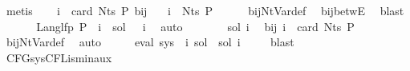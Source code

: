 \begin{isabellebody}
\ metis\isanewline
\isanewline
\ \ \isamarkupfalse%
\ {\isacartoucheopen}i\ {\isacharless}{\kern0pt}\ card\ {\isacharparenleft}{\kern0pt}Nts\ P{\isacharparenright}{\kern0pt}{\isacartoucheclose}\ bij{\isacharunderscore}{\kern0pt}{\isasymgamma}{\isacharunderscore}{\kern0pt}{\isasymgamma}{\isacharprime}{\kern0pt}\ \isamarkupfalse%
\ {\isachardoublequoteopen}{\isasymgamma}\ i\ {\isasymin}\ Nts\ P{\isachardoublequoteclose}\isanewline
\ \ \ \ \isamarkupfalse%
\ bij{\isacharunderscore}{\kern0pt}Nt{\isacharunderscore}{\kern0pt}Var{\isacharunderscore}{\kern0pt}def\ \isamarkupfalse%
\ bij{\isacharunderscore}{\kern0pt}betwE\ \isamarkupfalse%
\ blast\isanewline
\ \ \isamarkupfalse%
\ {\isacharasterisk}{\kern0pt}\ \isamarkupfalse%
\ {\isachardoublequoteopen}Lang{\isacharunderscore}{\kern0pt}lfp\ P\ {\isacharparenleft}{\kern0pt}{\isasymgamma}\ i{\isacharparenright}{\kern0pt}\ {\isacharequal}{\kern0pt}\ sol\ {\isacharparenleft}{\kern0pt}{\isasymgamma}{\isacharprime}{\kern0pt}\ {\isacharparenleft}{\kern0pt}{\isasymgamma}\ i{\isacharparenright}{\kern0pt}{\isacharparenright}{\kern0pt}{\isachardoublequoteclose}\ \isamarkupfalse%
\ auto\isanewline
\ \ \isamarkupfalse%
\ \isamarkupfalse%
\ {\isachardoublequoteopen}{\isasymdots}\ {\isacharequal}{\kern0pt}\ sol\ i{\isachardoublequoteclose}\ \isamarkupfalse%
\ bij{\isacharunderscore}{\kern0pt}{\isasymgamma}{\isacharunderscore}{\kern0pt}{\isasymgamma}{\isacharprime}{\kern0pt}\ {\isacartoucheopen}i\ {\isacharless}{\kern0pt}\ card\ {\isacharparenleft}{\kern0pt}Nts\ P{\isacharparenright}{\kern0pt}{\isacartoucheclose}\ \isamarkupfalse%
\ bij{\isacharunderscore}{\kern0pt}Nt{\isacharunderscore}{\kern0pt}Var{\isacharunderscore}{\kern0pt}def\ \isamarkupfalse%
\ auto\isanewline
\ \ \isamarkupfalse%
\ \isamarkupfalse%
\ {\isachardoublequoteopen}eval\ {\isacharparenleft}{\kern0pt}sys\ {\isacharbang}{\kern0pt}\ i{\isacharparenright}{\kern0pt}\ sol\ {\isasymsubseteq}\ sol\ i{\isachardoublequoteclose}\ \isamarkupfalse%
\ {}\ \isamarkupfalse%
\ blast\isanewline
{}\isamarkupfalse%
%
\endisatagproof
{\isafoldproof}%
%
\isadelimproof
\isanewline
%
\endisadelimproof
\isanewline
{}\isamarkupfalse%
\ CFG{\isacharunderscore}{\kern0pt}sys{\isacharunderscore}{\kern0pt}CFL{\isacharunderscore}{\kern0pt}is{\isacharunderscore}{\kern0pt}min{\isacharunderscore}{\kern0pt}aux{\isacharcolon}{\kern0pt}\isanewline

\end{isabellebody}
